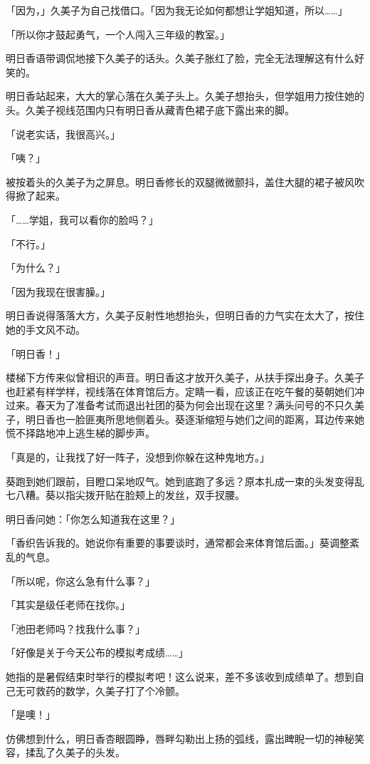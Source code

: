 \documentclass[UTF8]{ctexart}
\begin{document}
    「因为，」久美子为自己找借口。「因为我无论如何都想让学姐知道，所以……」 

    「所以你才鼓起勇气，一个人闯入三年级的教室。」 

    明日香语带调侃地接下久美子的话头。久美子胀红了脸，完全无法理解这有什么好笑的。 

    明日香站起来，大大的掌心落在久美子头上。久美子想抬头，但学姐用力按住她的头。久美子视线范围内只有明日香从藏青色裙子底下露出来的脚。 

    「说老实话，我很高兴。」 

    「咦？」 

    被按着头的久美子为之屏息。明日香修长的双腿微微颤抖，盖住大腿的裙子被风吹得掀了起来。 

    「……学姐，我可以看你的脸吗？」 

    「不行。」 

    「为什么？」 

    「因为我现在很害臊。」 

    明日香说得落落大方，久美子反射性地想抬头，但明日香的力气实在太大了，按住她的手文风不动。 

    「明日香！」 

    楼梯下方传来似曾相识的声音。明日香这才放开久美子，从扶手探出身子。久美子也赶紧有样学样，视线落在体育馆后方。定睛一看，应该正在吃午餐的葵朝她们冲过来。春天为了准备考试而退出社团的葵为何会出现在这里？满头问号的不只久美子，明日香也一脸匪夷所思地侧着头。葵逐渐缩短与她们之间的距离，耳边传来她慌不择路地冲上逃生梯的脚步声。 

    「真是的，让我找了好一阵子，没想到你躲在这种鬼地方。」 

    葵跑到她们跟前，目瞪口呆地叹气。她到底跑了多远？原本扎成一束的头发变得乱七八糟。葵以指尖拨开贴在脸颊上的发丝，双手扠腰。 

    明日香问她：「你怎么知道我在这里？」 

    「香织告诉我的。她说你有重要的事要谈时，通常都会来体育馆后面。」葵调整紊乱的气息。 

    「所以呢，你这么急有什么事？」 

    「其实是级任老师在找你。」 

    「池田老师吗？找我什么事？」 

    「好像是关于今天公布的模拟考成绩……」 

    她指的是暑假结束时举行的模拟考吧！这么说来，差不多该收到成绩单了。想到自己无可救药的数学，久美子打了个冷颤。 

    「是噢！」 

    仿佛想到什么，明日香杏眼圆睁，唇畔勾勒出上扬的弧线，露出睥睨一切的神秘笑容，揉乱了久美子的头发。 
\end{document}
